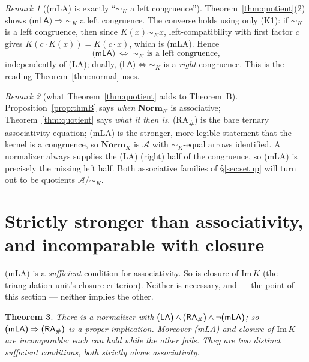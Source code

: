 \documentclass[11pt]{amsart}
\theoremstyle{plain}
\newtheorem{theorem}{Theorem}[section]
\theoremstyle{definition}
\theoremstyle{remark}
\newtheorem{remark}[theorem]{Remark}
\newcommand{\Norm}{\mathbf{Norm}}
\newcommand{\Img}{\mathrm{Im}\,}
\newcommand{\LA}{\textsf{(LA)}}
\newcommand{\mLA}{\textsf{(mLA)}}
\newcommand{\RA}{\textsf{(RA}\textsubscript{\#}\textsf{)}}
\newcommand{\simK}{\mathrel{\sim_{K}}}
\begin{document}
\begin{remark}[\mLA{} is exactly ``$\simK$ a left congruence'']
\label{rem:leftcong}
Theorem~\ref{thm:quotient}(2) shows $\mLA{}\Rightarrow\simK$ a left congruence. The converse holds
using only \textsf{(K1)}: if $\simK$ is a left congruence, then since $K(x)\simK x$, left-compatibility
with first factor $c$ gives $K(c\cdot K(x))=K(c\cdot x)$, which is \mLA{}. Hence
\[
  \mLA{}\ \Longleftrightarrow\ \simK\text{ is a left congruence,}
\]
independently of \LA{}; dually, $\LA{}\Leftrightarrow\simK$ is a \emph{right} congruence. This is the
reading Theorem~\ref{thm:normal} uses.
\end{remark}

\begin{remark}[what Theorem~\ref{thm:quotient} adds to Theorem~B]
\label{rem:added}
Proposition~\ref{prop:thmB} says \emph{when} $\Norm_K$ is associative; Theorem~\ref{thm:quotient} says
\emph{what it then is}. \RA{} is the bare ternary associativity equation; \mLA{} is the stronger,
more legible statement that the kernel is a congruence, so $\Norm_K$ is $\mathcal{A}$ with
$\simK$-equal arrows identified. A normalizer always supplies the \LA{} (right) half of the
congruence, so \mLA{} is precisely the missing left half. Both associative families of
§\ref{sec:setup} will turn out to be quotients $\mathcal{A}/\!\simK$.
\end{remark}

\section{Strictly stronger than associativity, and incomparable with closure}
\label{sec:thm2}

\mLA{} is a \emph{sufficient} condition for associativity. So is closure of $\Img K$ (the triangulation
unit's closure criterion). Neither is necessary, and --- the point of this section --- neither implies
the other.

\begin{theorem}
\label{thm:strict}
There is a normalizer with $\LA{}\wedge\RA{}\wedge\neg\mLA{}$; so $\mLA{}\Rightarrow\RA{}$ is a proper
implication. Moreover \mLA{} and closure of $\Img K$ are \emph{incomparable}: each can hold while the
other fails. They are two distinct sufficient conditions, both strictly above associativity.
\end{theorem}
\end{document}
